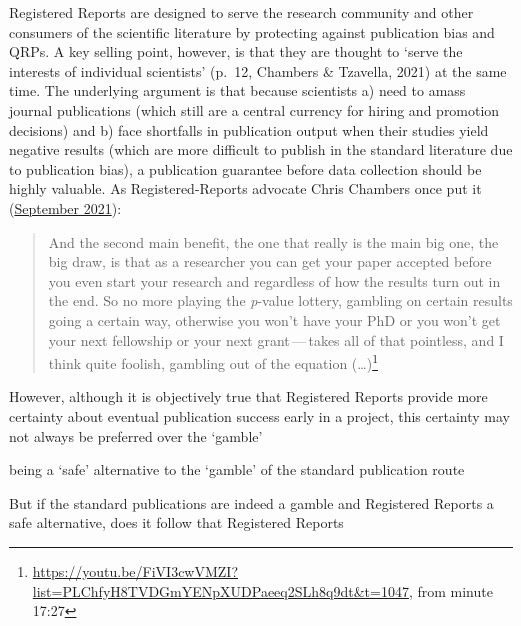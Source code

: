 \documentclass[
  ,man,mask,floatsintext]{apa6}
\begin{document}
Registered Reports are designed to serve the research community and other consumers of the scientific literature by protecting against publication bias and QRPs.
A key selling point, however,
is that they are thought to `serve the interests of individual scientists' (p.~12, Chambers \& Tzavella, 2021) at the same time.
The underlying argument is that because scientists a) need to amass journal publications (which still are a central currency for hiring and promotion decisions) and b) face shortfalls in publication output when their studies yield negative results (which are more difficult to publish in the standard literature due to publication bias), a publication guarantee before data collection
should be highly valuable.
As Registered-Reports advocate Chris Chambers once put it (\href{https://youtu.be/FiVI3cwVMZI?list=PLChfyH8TVDGmYENpXUDPaeeq2SLh8q9dt\&t=1047}{September 2021}):

\begin{quote}
And the second main benefit, the one that really is the main big one, the big draw, is that as a researcher you can get your paper accepted before you even start your research and regardless of how the results turn out in the end. So no more playing the \emph{p}-value lottery, gambling on certain results going a certain way, otherwise you won't have your PhD or you won't get your next fellowship or your next grant\(\,\)---\(\,\)takes all of that pointless, and I think quite foolish, gambling out of the equation (\ldots)\footnote{\url{https://youtu.be/FiVI3cwVMZI?list=PLChfyH8TVDGmYENpXUDPaeeq2SLh8q9dt\&t=1047}, from minute 17:27}
\end{quote}

However, although it is objectively true that Registered Reports provide more certainty about eventual publication success early in a project, this certainty may not always be preferred over the `gamble'

being a `safe' alternative to the `gamble' of the standard publication route

But if the standard publications are indeed a gamble and Registered Reports a safe alternative, does it follow that Registered Reports
\end{document}
